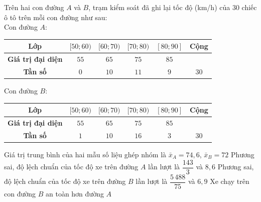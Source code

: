 \begin{ex}%
	Trên hai con đường $A$ và $B$, trạm kiểm soát đã ghi lại tốc độ (km/h) của $30$ chiếc ô tô trên mỗi con đường như sau:\\
	Con đường $A$:
	\begin{center}
		\begin{tabular}{|c|c|c|c|c|c|}
			\hline 
			\bf Lớp &$[50;60)$ &$[60;70)$ &$[70;80)$&$[80;90]$& Cộng\\ 
			\hline
			\bf Giá trị đại diện &$55$&$65$&$75$&$85$&\\
			\hline
			\bf Tần số &$0$&$10$&$11$&$9$&$30$\\
			\hline
		\end{tabular}
	\end{center}
	Con đường $B$:
	\begin{center}
		\begin{tabular}{|c|c|c|c|c|c|}
			\hline 
			\bf Lớp &$[50;60)$ &$[60;70)$ &$[70;80)$&$[80;90]$& Cộng\\ 
			\hline
			\bf Giá trị đại diện &$55$&$65$&$75$&$85$&\\
			\hline
			\bf Tần số &$1$&$10$&$16$&$3$&$30$\\
			\hline
		\end{tabular}
	\end{center}
	\choiceTF
	{\True Giá trị trung bình của hai mẫu số liệu ghép nhóm là $\bar{x}_A=74{,}6$, $\bar{x}_B=72$}
	{Phương sai, độ lệch chuẩn của tốc độ xe trên đường $A$ lần lượt là $\dfrac{143}{3}$ và $8{,}6$}
	{Phương sai, độ lệch chuẩn của tốc độ xe trên đường $B$ lần lượt là $\dfrac{5\,488}{75}$ và $6{,}9$}
	{\True Xe chạy trên con đường $B$ an toàn hơn đường $A$}
\end{ex}

